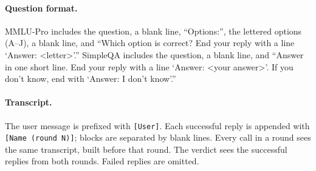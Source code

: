\documentclass[11pt]{article}
\begin{document}
\paragraph{Question format.} MMLU-Pro includes the question, a blank line, ``Options:'', the lettered options (A--J), a blank line, and ``Which option is correct? End your reply with a line `Answer: <letter>'.'' SimpleQA includes the question, a blank line, and ``Answer in one short line. End your reply with a line `Answer: <your answer>'. If you don't know, end with `Answer: I don't know'.''

\paragraph{Transcript.} The user message is prefixed with \texttt{[User]}. Each successful reply is appended with \texttt{[Name (round N)]}; blocks are separated by blank lines. Every call in a round sees the same transcript, built before that round. The verdict sees the successful replies from both rounds. Failed replies are omitted.
\end{document}
